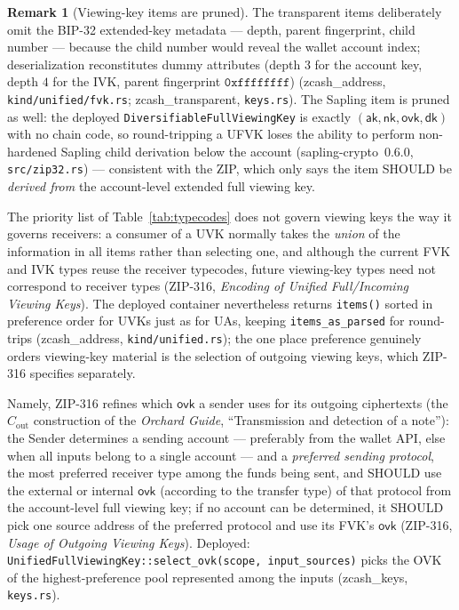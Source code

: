 \documentclass[11pt,a4paper]{article}
\theoremstyle{definition}
\newtheorem{remark}[theorem]{Remark}
\newcommand{\aksym}{\ensuremath{\mathsf{ak}}}
\newcommand{\nksym}{\ensuremath{\mathsf{nk}}}
\newcommand{\ovk}{\ensuremath{\mathsf{ovk}}}
\newcommand{\dk}{\ensuremath{\mathsf{dk}}}
\begin{document}
\begin{remark}[Viewing-key items are pruned]\label{rem:vk-pruning}
The transparent items deliberately omit the BIP-32 extended-key metadata
--- depth, parent fingerprint, child number --- because the child number
would reveal the wallet account index; deserialization reconstitutes dummy
attributes (depth $3$ for the account key, depth $4$ for the IVK, parent
fingerprint $\mathtt{0xffffffff}$) (\textsf{zcash\_address},
\texttt{kind/unified/fvk.rs}; \textsf{zcash\_transparent},
\texttt{keys.rs}). The Sapling item is pruned as well: the deployed
\texttt{DiversifiableFullViewingKey} is exactly
$(\aksym, \nksym, \ovk, \dk)$ with no chain code, so round-tripping a UFVK
loses the ability to perform non-hardened Sapling child derivation below
the account (\textsf{sapling-crypto}~0.6.0, \texttt{src/zip32.rs}) ---
consistent with the ZIP, which only says the item SHOULD be
\emph{derived from} the account-level extended full viewing key.
\end{remark}

The priority list of Table~\ref{tab:typecodes} does not govern viewing
keys the way it governs receivers: a consumer of a UVK normally takes the
\emph{union} of the information in all items rather than selecting one,
and although the current FVK and IVK types reuse the receiver typecodes,
future viewing-key types need not correspond to receiver types (ZIP-316,
\emph{Encoding of Unified Full/Incoming Viewing Keys}). The deployed
container nevertheless returns \texttt{items()} sorted in preference order
for UVKs just as for UAs, keeping \texttt{items\_as\_parsed} for
round-trips (\textsf{zcash\_address}, \texttt{kind/unified.rs}); the one
place preference genuinely orders viewing-key material is the selection of
outgoing viewing keys, which ZIP-316 specifies separately.

Namely, ZIP-316 refines which $\ovk$ a sender uses for its outgoing
ciphertexts (the $C_{\mathrm{out}}$ construction of the \emph{Orchard
Guide}, ``Transmission and detection of a note''): the Sender determines a
sending account --- preferably from the wallet API, else when all inputs
belong to a single account --- and a \emph{preferred sending protocol},
the most preferred receiver type among the funds being sent, and SHOULD
use the external or internal $\ovk$ (according to the transfer type) of
that protocol from the account-level full viewing key; if no account can
be determined, it SHOULD pick one source address of the preferred protocol
and use its FVK's $\ovk$ (ZIP-316, \emph{Usage of Outgoing Viewing Keys}).
Deployed: \texttt{UnifiedFullViewingKey::select\_ovk(scope,
input\_sources)} picks the OVK of the highest-preference pool represented
among the inputs (\textsf{zcash\_keys}, \texttt{keys.rs}).
\end{document}
